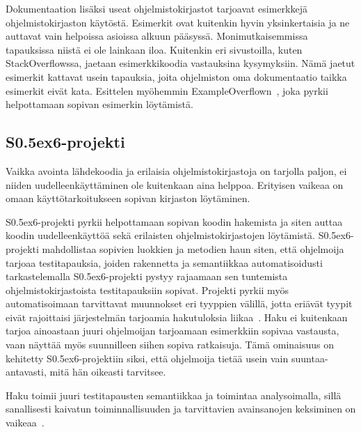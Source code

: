 \documentclass[finnish]{tktltiki2}
\theoremstyle{definition}
\theoremstyle{remark}
\begin{document}
Dokumentaation lisäksi useat ohjelmistokirjastot tarjoavat esimerkkejä ohjelmistokirjaston käytöstä. Esimerkit ovat kuitenkin hyvin yksinkertaisia ja ne auttavat vain helpoissa asioissa alkuun pääsyssä. Monimutkaisemmissa tapauksissa niistä ei ole lainkaan iloa. Kuitenkin eri sivustoilla, kuten StackOverflowssa, jaetaan esimerkkikoodia vastauksina kysymyksiin. Nämä jaetut esimerkit kattavat usein tapauksia, joita ohjelmiston oma dokumentaatio taikka esimerkit eivät kata. Esittelen myöhemmin ExampleOverflown~\cite{example-overflow-social-media-for-code-recommendations}, joka pyrkii helpottamaan sopivan esimerkin löytämistä.

\subsection{S\raise0.5ex\hbox{6}-projekti}
Vaikka avointa lähdekoodia ja erilaisia ohjelmistokirjastoja on tarjolla paljon, ei niiden uudelleenkäyttäminen ole kuitenkaan aina helppoa. Erityisen vaikeaa on omaan käyttötarkoitukseen sopivan kirjaston löytäminen.

S\raise0.5ex\hbox{6}-projekti pyrkii helpottamaan sopivan koodin hakemista ja siten auttaa koodin uudelleenkäyttöä sekä erilaisten ohjelmistokirjastojen löytämistä. S\raise0.5ex\hbox{6}-projekti mahdollistaa sopivien luokkien ja metodien haun siten, että ohjelmoija tarjoaa testitapauksia, joiden rakennetta ja semantiikkaa automatisoidusti tarkastelemalla S\raise0.5ex\hbox{6}-projekti pystyy rajaamaan sen tuntemista ohjelmistokirjastoista testitapauksiin sopivat. Projekti pyrkii myös automatisoimaan tarvittavat muunnokset eri tyyppien välillä, jotta eriävät tyypit eivät rajoittaisi järjestelmän tarjoamia hakutuloksia liikaa~\cite{what-to-search-for}. Haku ei kuitenkaan tarjoa ainoastaan juuri ohjelmoijan tarjoamaan esimerkkiin sopivaa vastausta, vaan näyttää myös suunnilleen siihen sopiva ratkaisuja. Tämä ominaisuus on kehitetty S\raise0.5ex\hbox{6}-projektiin siksi, että ohjelmoija tietää usein vain suuntaa-antavasti, mitä hän oikeasti tarvitsee.

Haku toimii juuri testitapausten semantiikkaa ja toimintaa analysoimalla, sillä sanallisesti kaivatun toiminnallisuuden ja tarvittavien avainsanojen keksiminen on vaikeaa~\cite{what-to-search-for}.
\end{document}
